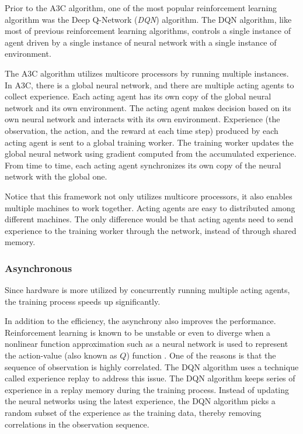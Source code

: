         Prior to the A3C algorithm, one of the most popular reinforcement learning algorithm was
        the Deep Q-Network (\emph{DQN}) algorithm. \cite{mnih_human-level_2015}
        The DQN algorithm, like most of previous reinforcement learning algorithms,
        controls a single instance of agent driven by a single instance of neural network
        with a single instance of environment.

        The A3C algorithm utilizes multicore processors by running multiple instances.
        In A3C, there is a global neural network,
        and there are multiple acting agents to collect experience.
        Each acting agent has its own copy of the global neural network and its own environment.
        The acting agent makes decision based on its own neural network and interacts with its own environment.
        Experience (the observation, the action, and the reward at each time step) produced by each acting agent
        is sent to a global training worker.
        The training worker updates the global neural network using gradient computed from the accumulated experience.
        From time to time, each acting agent synchronizes its own copy of the neural network with the global one.

        Notice that this framework not only utilizes multicore processors,
        it also enables multiple machines to work together.
        Acting agents are easy to distributed among different machines.
        The only difference would be that acting agents need to send experience to the training worker
        through the network, instead of through shared memory.

        \subsubsection{Asynchronous}

            Since hardware is more utilized by concurrently running multiple acting agents,
            the training process speeds up significantly.

            In addition to the efficiency, the asynchrony also improves the performance.
            Reinforcement learning is known to be unstable or even to diverge
            when a nonlinear function approximation such as a neural network is used to represent the action-value
            (also known as $Q$) function \cite{tsitsiklis_analysis_1997}.
            One of the reasons is that the sequence of observation is highly correlated.
            The DQN algorithm uses a technique called experience replay to address this issue.
            The DQN algorithm keeps series of experience in a replay memory during the training process.
            Instead of updating the neural networks using the latest experience,
            the DQN algorithm picks a random subset of the experience as the training data,
            thereby removing correlations in the observation sequence.


